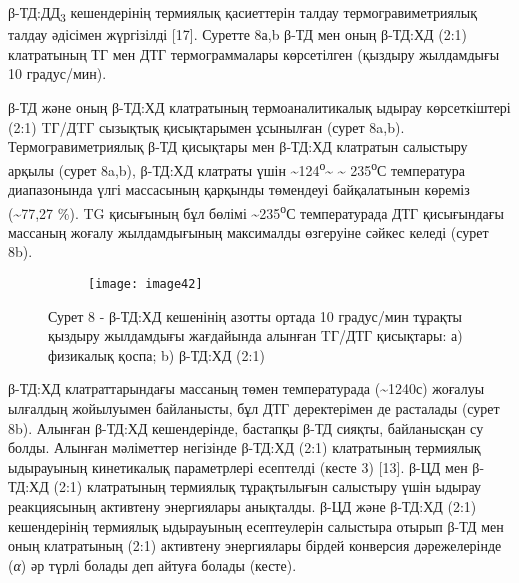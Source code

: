 \begin{multicols}{2}
β-ТД:ДД\textsubscript{3} кешендерінің термиялық қасиеттерін талдау
термогравиметриялық талдау әдісімен жүргізілді {[}17{]}. Суретте 8а,b
β-ТД мен оның β-ТД:ХД (2:1) клатратының ТГ мен ДТГ термограммалары
көрсетілген (қыздыру жылдамдығы 10 градус/мин).

β-ТД және оның β-ТД:ХД клатратының термоаналитикалық ыдырау
көрсеткіштері (2:1) TГ/ДTГ сызықтық қисықтарымен ұсынылған (сурет 8a,b).
Термогравиметриялық β-ТД қисықтары мен β-ТД:ХД клатратын салыстыру
арқылы (сурет 8a,b), β-ТД:ХД клатраты үшін
\textasciitilde124\textsuperscript{о}\textasciitilde{} \textasciitilde{}
235\textsuperscript{о}С температура диапазонында үлгі массасының
қарқынды төмендеуі байқалатынын көреміз (\textasciitilde77,27 \%). TG
қисығының бұл бөлімі \textasciitilde235\textsuperscript{о}С
температурада ДТГ қисығындағы массаның жоғалу жылдамдығының максималды
өзгеруіне сәйкес келеді (сурет 8b).
\end{multicols}

\begin{figure}[H]
\centering
\begin{subfigure}[b]{0.8\textwidth}
\centering
\texttt{[image: image42]}
\end{subfigure}
\caption*{Сурет 8 - β-ТД:ХД кешенінің азотты ортада 10 градус/мин тұрақты қыздыру
жылдамдығы жағдайында алынған TГ/ДТГ қисықтары: а) физикалық қоспа; b)
β-ТД:ХД (2:1)}
\end{figure}


\begin{multicols}{2}
β-ТД:ХД клатраттарындағы массаның төмен температурада
(\textasciitilde1240с) жоғалуы ылғалдың жойылуымен байланысты, бұл ДТГ
деректерімен де расталады (сурет 8b). Алынған β-ТД:ХД кешендерінде,
бастапқы β-ТД сияқты, байланысқан су болды. Алынған мәліметтер негізінде
β-ТД:ХД (2:1) клатратының термиялық ыдырауының кинетикалық параметрлері
есептелді (кесте 3) {[}13{]}. β-ЦД мен β-ТД:ХД (2:1) клатратының
термиялық тұрақтылығын салыстыру үшін ыдырау реакциясының активтену
энергиялары анықталды. β-ЦД және β-ТД:ХД (2:1) кешендерінің термиялық
ыдырауының есептеулерін салыстыра отырып β-ТД мен оның клатратының (2:1)
активтену энергиялары бірдей конверсия дәрежелерінде (\emph{α}) әр түрлі
болады деп айтуға болады (кесте).
\end{multicols}

